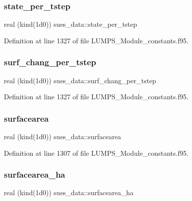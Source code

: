 \subsubsection{\texorpdfstring{state\+\_\+per\+\_\+tstep}{state\_per\_tstep}}
{\footnotesize\ttfamily real (kind(1d0)) sues\+\_\+data\+::state\+\_\+per\+\_\+tstep}



Definition at line 1327 of file L\+U\+M\+P\+S\+\_\+\+Module\+\_\+constants.\+f95.

\mbox{\label{namespacesues__data_a1848f093a3dd5ebdc1da775e9cda8509}} 
\subsubsection{\texorpdfstring{surf\+\_\+chang\+\_\+per\+\_\+tstep}{surf\_chang\_per\_tstep}}
{\footnotesize\ttfamily real (kind(1d0)) sues\+\_\+data\+::surf\+\_\+chang\+\_\+per\+\_\+tstep}



Definition at line 1327 of file L\+U\+M\+P\+S\+\_\+\+Module\+\_\+constants.\+f95.

\mbox{\label{namespacesues__data_a9d6a1e2ae7fe7c36fb4aaa9e2e3c2137}} 
\subsubsection{\texorpdfstring{surfacearea}{surfacearea}}
{\footnotesize\ttfamily real (kind(1d0)) sues\+\_\+data\+::surfacearea}



Definition at line 1307 of file L\+U\+M\+P\+S\+\_\+\+Module\+\_\+constants.\+f95.

\mbox{\label{namespacesues__data_a77ef6a343e9a419577fa473535ab3c16}} 
\subsubsection{\texorpdfstring{surfacearea\+\_\+ha}{surfacearea\_ha}}
{\footnotesize\ttfamily real (kind(1d0)) sues\+\_\+data\+::surfacearea\+\_\+ha}



